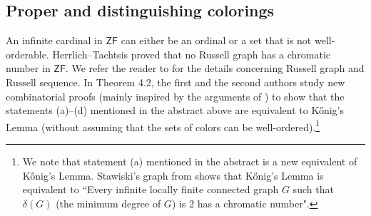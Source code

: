 \documentclass[12pt,reqno,a4paper]{amsart}
\theoremstyle{definition}
\begin{document}
	
	\subsection{Proper and distinguishing colorings}
	An infinite cardinal in $\mathsf{ZF}$ can either be an ordinal or a set that is not well-orderable. 
	Herrlich--Tachtsis \cite[Proposition 23]{HT2006} proved that no Russell graph has a chromatic number in $\mathsf{ZF}$. We refer the reader to
	\cite{HT2006} for the details concerning Russell graph and Russell sequence.
	In Theorem 4.2, the first and the second authors study new combinatorial proofs (mainly inspired by the arguments of \cite[Proposition 23]{HT2006}) to show that the statements (a)--(d) mentioned in the abstract above are equivalent to K\H{o}nig's Lemma (without assuming that the sets of colors can be well-ordered).\footnote{We note that statement (a) mentioned in the abstract is a new equivalent of K\H{o}nig's Lemma. Stawiski's graph from \cite[Theorem 3.6]{Sta2023} shows that K\H{o}nig's Lemma is equivalent to ``Every infinite locally finite connected graph $G$ such that $\delta(G)$ (the minimum degree of $G$) is 2 has a chromatic number".}
	
\end{document}
